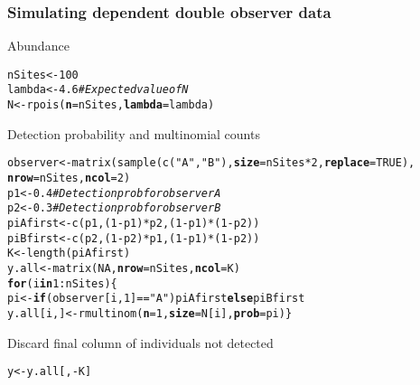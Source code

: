 \documentclass[color=usenames,dvipsnames]{beamer}\usepackage[]{graphicx}\usepackage[]{xcolor}
\makeatletter
\newcommand{\hlnum}[1]{\textcolor[rgb]{0.69,0.494,0}{#1}}%
\newcommand{\hlsng}[1]{\textcolor[rgb]{0.749,0.012,0.012}{#1}}%
\newcommand{\hlcom}[1]{\textcolor[rgb]{0.514,0.506,0.514}{\textit{#1}}}%
\newcommand{\hlopt}[1]{\textcolor[rgb]{0,0,0}{#1}}%
\newcommand{\hldef}[1]{\textcolor[rgb]{0,0,0}{#1}}%
\newcommand{\hlkwa}[1]{\textcolor[rgb]{0,0,0}{\textbf{#1}}}%
\newcommand{\hlkwb}[1]{\textcolor[rgb]{0,0.341,0.682}{#1}}%
\newcommand{\hlkwc}[1]{\textcolor[rgb]{0,0,0}{\textbf{#1}}}%
\newcommand{\hlkwd}[1]{\textcolor[rgb]{0.004,0.004,0.506}{#1}}%
\newenvironment{kframe}{%
 \def\at@end@of@kframe{}%
 \ifinner\ifhmode%
  \def\at@end@of@kframe{\end{minipage}}%
  \begin{minipage}{\columnwidth}%
 \fi\fi%
 \def\FrameCommand##1{\hskip\@totalleftmargin \hskip-\fboxsep
 \colorbox{shadecolor}{##1}\hskip-\fboxsep
     \hskip-\linewidth \hskip-\@totalleftmargin \hskip\columnwidth}%
 \MakeFramed {\advance\hsize-\width
   \@totalleftmargin\z@ \linewidth\hsize
   \@setminipage}}%
 {\par\unskip\endMakeFramed%
 \at@end@of@kframe}
\newenvironment{knitrout}{}{} %
\makeatother
\begin{document}
\begin{frame}[fragile]
  \frametitle{Simulating dependent double observer data}
  \small
  Abundance
\begin{knitrout}\scriptsize
{}\color{fgcolor}\begin{kframe}
\begin{alltt}
\hldef{nSites} \hlkwb{<-} \hlnum{100}
\hldef{lambda} \hlkwb{<-} \hlnum{4.6}  \hlcom{# Expected value of N}
\hldef{N} \hlkwb{<-} \hlkwd{rpois}\hldef{(}\hlkwc{n}\hldef{=nSites,} \hlkwc{lambda}\hldef{=lambda)}
\end{alltt}
\end{kframe}
\end{knitrout}
  \pause
  \vfill
  Detection probability and multinomial counts
\begin{knitrout}\scriptsize
{}\color{fgcolor}\begin{kframe}
\begin{alltt}
\hldef{observer} \hlkwb{<-} \hlkwd{matrix}\hldef{(}\hlkwd{sample}\hldef{(}\hlkwd{c}\hldef{(}\hlsng{"A"}\hldef{,}\hlsng{"B"}\hldef{),} \hlkwc{size}\hldef{=nSites}\hlopt{*}\hlnum{2}\hldef{,} \hlkwc{replace}\hldef{=}\hlnum{TRUE}\hldef{),}
                   \hlkwc{nrow}\hldef{=nSites,} \hlkwc{ncol}\hldef{=}\hlnum{2}\hldef{)}
\hldef{p1} \hlkwb{<-} \hlnum{0.4}  \hlcom{# Detection prob for observer A}
\hldef{p2} \hlkwb{<-} \hlnum{0.3}  \hlcom{# Detection prob for observer B}
\hldef{piAfirst} \hlkwb{<-} \hlkwd{c}\hldef{(p1, (}\hlnum{1}\hlopt{-}\hldef{p1)}\hlopt{*}\hldef{p2, (}\hlnum{1}\hlopt{-}\hldef{p1)}\hlopt{*}\hldef{(}\hlnum{1}\hlopt{-}\hldef{p2))}
\hldef{piBfirst} \hlkwb{<-} \hlkwd{c}\hldef{(p2, (}\hlnum{1}\hlopt{-}\hldef{p2)}\hlopt{*}\hldef{p1, (}\hlnum{1}\hlopt{-}\hldef{p1)}\hlopt{*}\hldef{(}\hlnum{1}\hlopt{-}\hldef{p2))}
\hldef{K} \hlkwb{<-} \hlkwd{length}\hldef{(piAfirst)}
\hldef{y.all} \hlkwb{<-} \hlkwd{matrix}\hldef{(}\hlnum{NA}\hldef{,} \hlkwc{nrow}\hldef{=nSites,} \hlkwc{ncol}\hldef{=K)}
\hlkwa{for}\hldef{(i} \hlkwa{in} \hlnum{1}\hlopt{:}\hldef{nSites) \{}
  \hldef{pi} \hlkwb{<-} \hlkwa{if}\hldef{(observer[i,}\hlnum{1}\hldef{]}\hlopt{==}\hlsng{"A"}\hldef{) piAfirst} \hlkwa{else} \hldef{piBfirst}
  \hldef{y.all[i,]} \hlkwb{<-} \hlkwd{rmultinom}\hldef{(}\hlkwc{n}\hldef{=}\hlnum{1}\hldef{,} \hlkwc{size}\hldef{=N[i],} \hlkwc{prob}\hldef{=pi)    \}}
\end{alltt}
\end{kframe}
\end{knitrout}
  \pause
  \vfill
  Discard final column of individuals not detected
\begin{knitrout}\scriptsize
{}\color{fgcolor}\begin{kframe}
\begin{alltt}
\hldef{y} \hlkwb{<-} \hldef{y.all[,}\hlopt{-}\hldef{K]}
\end{alltt}
\end{kframe}
\end{knitrout}
\end{frame}
\end{document}
